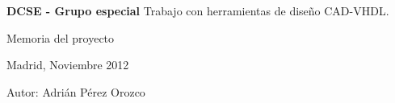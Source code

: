 \begin{titlepage}
\sffamily
\begin{flushright}

\rightskip=-1cm


\bigskip
\bigskip
\bigskip



\huge{\textbf{DCSE - Grupo especial}}
\linebreak
\LARGE{Trabajo con herramientas de diseño CAD-VHDL.}

\bigskip


\bigskip
\bigskip
\bigskip
\bigskip
\bigskip
\bigskip
\bigskip
\bigskip
\bigskip
\bigskip
\bigskip
\bigskip
\bigskip
\bigskip
\bigskip
\bigskip
\bigskip
\bigskip
\bigskip
\bigskip
\bigskip

\large{Memoria del proyecto}

\bigskip

\normalsize{Madrid, Noviembre 2012}

\bigskip
\bigskip
\bigskip
\bigskip
\bigskip
\bigskip
\bigskip
\bigskip
\bigskip
\bigskip
\bigskip
\bigskip
\bigskip
\bigskip
\bigskip
\bigskip

\normalsize{Autor:}
\linebreak
\large{Adrián Pérez Orozco}
\linebreak

\end{flushright}
\end{titlepage}
